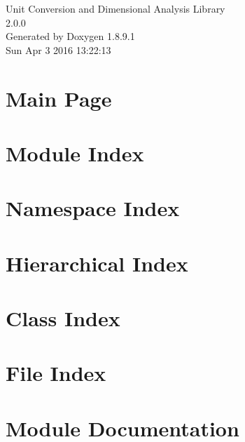 \documentclass[twoside]{book}
\newcommand{\+}{\discretionary{\mbox{\scriptsize$\hookleftarrow$}}{}{}}
\newcommand{\clearemptydoublepage}{%
  \newpage{\pagestyle{empty}\cleardoublepage}%
}
\begin{document}
\hypersetup{pageanchor=false,
             bookmarks=true,
             bookmarksnumbered=true,
             pdfencoding=unicode
            }
\begin{titlepage}
\vspace*{7cm}
\begin{center}%
{\Large Unit Conversion and Dimensional Analysis Library \\[1ex]\large 2.\+0.\+0 }\\
\vspace*{1cm}
{\large Generated by Doxygen 1.8.9.1}\\
\vspace*{0.5cm}
{\small Sun Apr 3 2016 13:22:13}\\
\end{center}
\end{titlepage}
\clearemptydoublepage
\tableofcontents
\clearemptydoublepage
{}
\hypersetup{pageanchor=true}

\chapter{Main Page}
\label{index}\hypertarget{index}{}
\chapter{Module Index}

\chapter{Namespace Index}

\chapter{Hierarchical Index}

\chapter{Class Index}

\chapter{File Index}

\chapter{Module Documentation}







\end{document}
